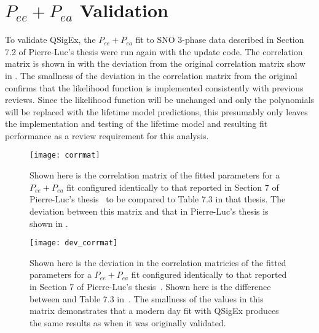 \section{\texorpdfstring{$P_{ee} + P_{ea}$}{Pee+Pea} Validation}

To validate QSigEx, the $P_{ee} + P_{ea}$ fit to SNO 3-phase data described in Section 7.2 of Pierre-Luc's thesis were run again with the update code. The correlation matrix is shown in  with the deviation from the original correlation matrix show in . The smallness of the deviation in the correlation matrix from the original confirms that the likelihood function is implemented consistently with previous reviews. Since the likelihood function will be unchanged and only the polynomials will be replaced with the lifetime model predictions, this presumably only leaves the implementation and testing of the lifetime model and resulting fit performance as a review requirement for this analysis. 

\begin{figure}
\centering
\texttt{[image: corrmat]} \\
\caption{
Shown here is the correlation matrix of the fitted parameters for a $P_{ee} + P_{ea}$ fit configured identically to that reported in Section 7 of Pierre-Luc's thesis~\cite{plthesis} to be compared to Table 7.3 in that thesis. The deviation between this matrix and that in Pierre-Luc's thesis is shown in .
}
\label{fig:qsigex_pee_pea_fits}
\end{figure}

\begin{figure}
\centering
\texttt{[image: dev\_corrmat]} \\
\caption{
Shown here is the deviation in the correlation matricies of the fitted parameters for a $P_{ee} + P_{ea}$ fit configured identically to that reported in Section 7 of Pierre-Luc's thesis~\cite{plthesis}. Shown here is the difference between  and Table 7.3 in~\cite{plthesis}. The smallness of the values in this matrix demonstrates that a modern day fit with QSigEx produces the same results as when it was originally validated.
}
\label{fig:qsigex_pee_pea_fits_dev}
\end{figure}
